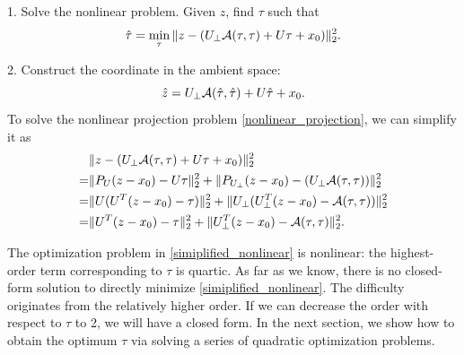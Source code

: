 \documentclass{article}
\theoremstyle{remark}
\begin{document}
1. Solve the nonlinear problem. Given $z$, find $\tau$ such that  
\begin{equation}\label{nonlinear_projection}
\hat{\tau} = \min_\tau \|z -  (U_{\perp} {\cal A} (\tau,\tau) + U \tau +x_0)\|_2^2.
\end{equation}

2. Construct the coordinate in the ambient space:
\[
\hat{z} = U_{\perp} {\cal A} (\hat{\tau},\hat{\tau}) + U \hat{\tau} +x_0.
\]
To solve the nonlinear projection problem \eqref{nonlinear_projection}, we can simplify it as
\begin{equation}\label{simiplified_nonlinear}
\begin{aligned}
   &\|z -  (U_{\perp} {\cal A} (\tau,\tau) + U \tau +x_0)\|_2^2\\
 =&\|P_U(z-x_0)-U\tau\|_2^2+\|P_{U_{\perp}}(z-x_0)-(U_{\perp} {\cal A}(\tau,\tau))\|_2^2 \\
  =&\|U (U^T (z-x_0)-\tau)\|_2^2+\|U_\perp (U_{\perp}^T(z-x_0)- {\cal A}(\tau,\tau))\|_2^2 \\
 =&\|U^T (z-x_0)-\tau\|_2^2+\|U^T_{\perp}(z-x_0)- {\cal A} (\tau,\tau)\|_2^2.
\end{aligned}
\end{equation}

The optimization problem in \eqref{simiplified_nonlinear} is nonlinear: the highest-order term corresponding to $\tau$ is quartic. As far as we know, there is no closed-form solution to directly minimize \eqref{simiplified_nonlinear}. The difficulty originates from the relatively higher order. If we can decrease the order with respect to $\tau$ to 2, we will have a closed form. In the next section, we show how to obtain the optimum $\tau$ via solving a series of quadratic optimization problems.
\end{document}
